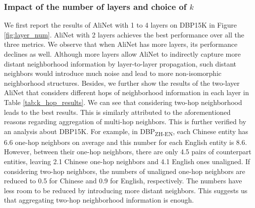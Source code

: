 \documentclass[letterpaper]{article} \usepackage{aaai20}  \usepackage{times}  \usepackage{helvet} \usepackage{courier}  \usepackage[hyphens]{url}  \usepackage{graphicx} \urlstyle{rm} \def\UrlFont{\rm}  \frenchspacing  \setlength{\pdfpagewidth}{8.5in}  \setlength{\pdfpageheight}{11in}  \usepackage{amsmath}
\begin{document}
\subsubsection{Impact of the number of layers and choice of $k$}
We first report the results of AliNet with 1 to 4 layers on DBP15K in Figure \ref{fig:layer_num}. AliNet with 2 layers achieves the best performance over all the three metrics. We observe that when AliNet has more layers, its performance declines as well. Although more layers allow AliNet to indirectly capture more distant neighborhood information by layer-to-layer propagation, such distant neighbors would introduce much noise and lead to more non-isomorphic neighborhood structures. Besides, we further show the results of the two-layer AliNet that considers different hops of neighborhood information in each layer in Table \ref{tab:k_hop_results}. We can see that considering two-hop neighborhood leads to the best results. This is similarly attributed to the aforementioned reasons regarding aggregation of multi-hop neighbors. This is further verified by an analysis about DBP15K. For example, in DBP\textsubscript{ZH-EN}, each Chinese entity has 6.6 one-hop neighbors on average and this number for each English entity is 8.6. However, between their one-hop neighbors, there are only 4.5 pairs of counterpart entities, leaving 2.1 Chinese one-hop neighbors and 4.1 English ones unaligned. If considering two-hop neighbors, the numbers of unaligned one-hop neighbors are reduced to 0.5 for Chinese and 0.9 for English, respectively. The numbers have less room to be reduced by introducing more distant neighbors. This suggests us that aggregating two-hop neighborhood information is enough.

\begin{table}[!t]
	\centering
	\caption{Results on DBP15K w.r.t. $k$ values}
	\label{tab:k_hop_results}
\end{table}
\end{document}
